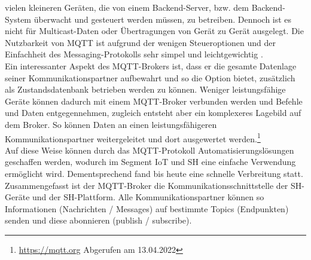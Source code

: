         vielen kleineren Geräten, die von einem Backend-Server, bzw. dem Backend-System überwacht und gesteuert werden müssen, zu 
        betreiben. Dennoch ist es nicht für Multicast-Daten oder Übertragungen von Gerät zu Gerät ausgelegt. Die Nutzbarkeit 
        von \acs{MQTT} ist aufgrund der wenigen Steueroptionen und der Einfachheit des Messaging-Protokolls sehr simpel und 
        leichtgewichtig \cite{Naik2017}. 
        \\
        \linebreak
        Ein interessanter Aspekt des \acs{MQTT}-Brokers ist, dass er die gesamte Datenlage seiner Kommunikationspartner aufbewahrt und 
        so die Option bietet, zusätzlich als Zustandsdatenbank betrieben werden zu können. Weniger leistungsfähige Geräte können dadurch  
        mit einem \acs{MQTT}-Broker verbunden werden und Befehle und Daten entgegennehmen, zugleich entsteht aber ein 
        komplexeres Lagebild auf dem Broker. So können Daten an einen leistungsfähigeren Kommunikationspartner 
        weitergeleitet und dort ausgewertet werden.\footnote{\url{https://mqtt.org} Abgerufen am 13.04.2022}
        \\
        Auf diese Weise können durch das \acl{MQTT}-Protokoll Automatisierungslösungen geschaffen werden, wodurch im Segment 
        \acs{IoT} und \acl{SH} eine einfache Verwendung ermöglicht wird. Dementsprechend fand bis heute eine 
        schnelle Verbreitung statt. 
        \\
        \linebreak
        Zusammengefasst ist der \acs{MQTT}-Broker die Kommunikationsschnittstelle der \acl{SH}-Geräte und der \acl{SH}-Plattform. 
        Alle Kommunikationspartner können so Informationen (Nachrichten / Messages) auf bestimmte Topics (Endpunkten) senden und 
        diese abonnieren (publish / subscribe). 

